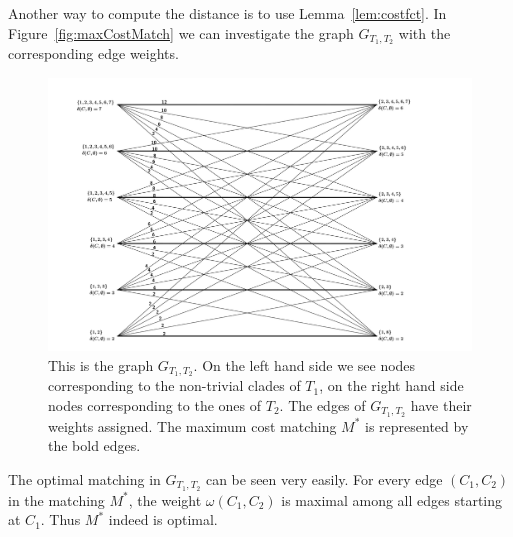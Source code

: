 Another way to compute the distance is to use Lemma~\ref{lem:costfct}. In Figure~\ref{fig:maxCostMatch} we can investigate the graph $G_{T_1,T_2}$ with the corresponding edge weights.
\begin{figure}
	\centering
	\includegraphics[width=1.25\textwidth]{figures/maxCostMatching.png}
    \caption{This is the graph $G_{T_1,T_2}$. On the left hand side we see nodes corresponding to the non-trivial clades of $T_1$, on the right hand side nodes corresponding to the ones of $T_2$. The edges of $G_{T_1,T_2}$ have their weights assigned. The maximum cost matching $M^*$ is represented by the bold edges.}
\end{figure} 
The optimal matching in $G_{T_1,T_2}$ can be seen very easily. For every edge $(C_1,C_2)$ in the matching $M^*$, the weight $\omega(C_1,C_2)$ is maximal among all edges starting at $C_1$. Thus $M^*$ indeed is optimal.

